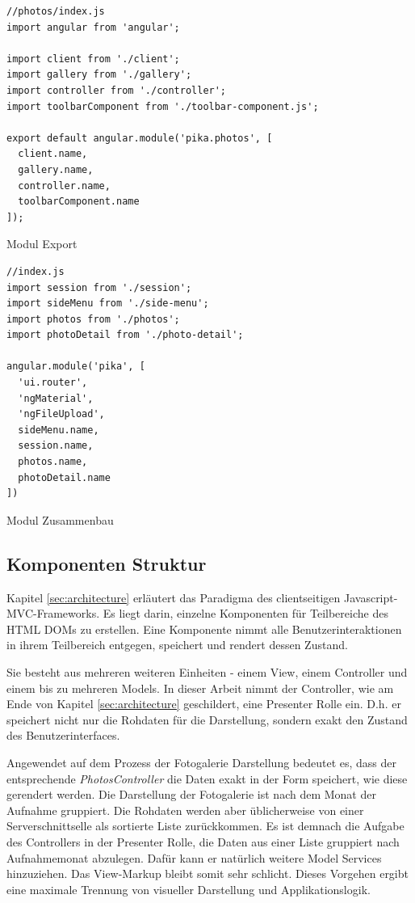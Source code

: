 \begin{listing}[H]
\begin{verbatim}
//photos/index.js
import angular from 'angular';

import client from './client';
import gallery from './gallery';
import controller from './controller';
import toolbarComponent from './toolbar-component.js';

export default angular.module('pika.photos', [
  client.name,
  gallery.name,
  controller.name,
  toolbarComponent.name
]);

\end{verbatim}
\caption{Modul Export}
\label{lst:module_export}
\end{listing}

\begin{listing}[H]
\begin{verbatim}
//index.js
import session from './session';
import sideMenu from './side-menu';
import photos from './photos';
import photoDetail from './photo-detail';

angular.module('pika', [
  'ui.router',
  'ngMaterial',
  'ngFileUpload',
  sideMenu.name,
  session.name,
  photos.name,
  photoDetail.name
])
\end{verbatim}
\caption{Modul Zusammenbau}
\label{lst:module_build}
\end{listing}

\subsection{Komponenten Struktur}

Kapitel \ref{sec:architecture} erläutert das Paradigma des clientseitigen Javascript-MVC-Frameworks. Es liegt darin, einzelne Komponenten für Teilbereiche des HTML DOMs zu erstellen. Eine Komponente nimmt alle Benutzerinteraktionen in ihrem Teilbereich entgegen, speichert und rendert dessen Zustand.

Sie besteht aus mehreren weiteren Einheiten - einem View, einem Controller und einem bis zu mehreren Models. In dieser Arbeit nimmt der Controller, wie am Ende von  Kapitel \ref{sec:architecture} geschildert, eine Presenter Rolle ein. D.h. er speichert nicht nur die Rohdaten für die Darstellung, sondern exakt den Zustand des Benutzerinterfaces.

Angewendet auf dem Prozess der Fotogalerie Darstellung bedeutet es, dass der entsprechende \emph{PhotosController} die Daten exakt in der Form speichert, wie diese gerendert werden. Die Darstellung der Fotogalerie ist nach dem Monat der Aufnahme gruppiert. Die Rohdaten werden aber üblicherweise von einer Serverschnittselle als sortierte Liste zurückkommen. Es ist demnach die Aufgabe des Controllers in der Presenter Rolle, die Daten aus einer Liste gruppiert nach Aufnahmemonat abzulegen. Dafür kann er natürlich weitere Model Services hinzuziehen. Das View-Markup bleibt somit sehr schlicht. Dieses Vorgehen ergibt eine maximale Trennung von visueller Darstellung und Applikationslogik.

